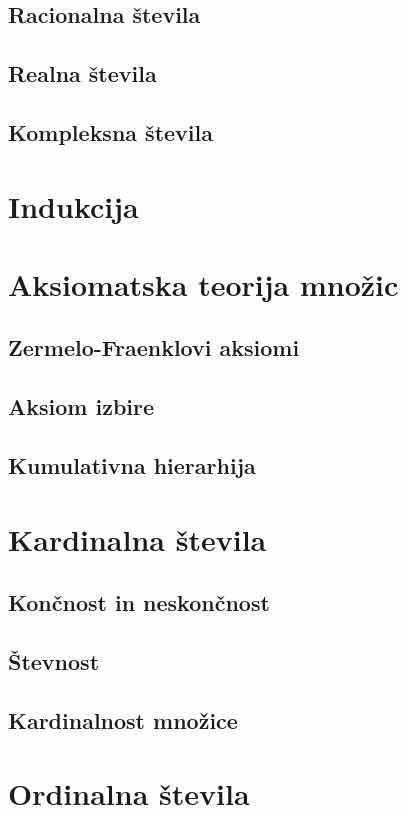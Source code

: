 \documentclass[11pt,a4paper,twoside]{book}
\begin{document}
                \section{Racionalna števila}
                \section{Realna števila}
                \section{Kompleksna števila}

        \chapter{Indukcija}

        \chapter{Aksiomatska teorija množic}
                \section{Zermelo-Fraenklovi aksiomi}
                \section{Aksiom izbire}
                \section{Kumulativna hierarhija}

        \chapter{Kardinalna števila}
                \section{Končnost in neskončnost}
                \section{Števnost}
                \section{Kardinalnost množice}

        \chapter{Ordinalna števila}
\end{document}
